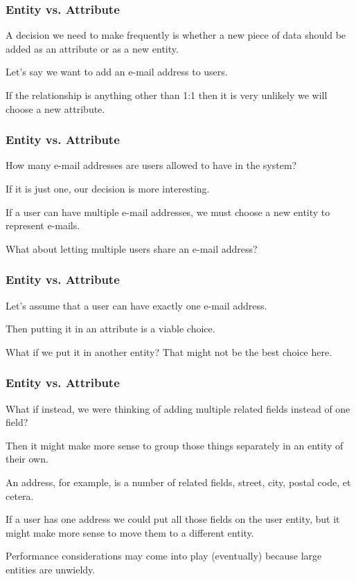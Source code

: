 \begin{frame}
\frametitle{Entity vs. Attribute}

A decision we need to make frequently is whether a new piece of data should be added as an attribute or as a new entity. 
 
Let's say we want to add an e-mail address to users.

If the relationship is anything other than 1:1 then it is very unlikely we will choose a new attribute.

\end{frame}



\begin{frame}
\frametitle{Entity vs. Attribute}

How many e-mail addresses are users allowed to have in the system? 

If it is just one, our decision is more interesting. 

If a user can have multiple e-mail addresses, we must choose a new entity to represent e-mails. 

What about letting multiple users share an e-mail address? 

\end{frame}



\begin{frame}
\frametitle{Entity vs. Attribute}

Let's assume that a user can have exactly one e-mail address. 

Then putting it in an attribute is a viable choice. 

What if we put it in another entity? That might not be the best choice here. 

\end{frame}



\begin{frame}
\frametitle{Entity vs. Attribute}

What if instead, we were thinking of adding multiple related fields instead of one field? 

Then it might make more sense to group those things separately in an entity of their own. 

An address, for example, is a number of related fields, street, city, postal code, et cetera. 

If a user has one address we could put all those fields on the user entity, but it might make more sense to move them to a different entity. 

Performance considerations may come into play (eventually) because large entities are unwieldy. 

\end{frame}



